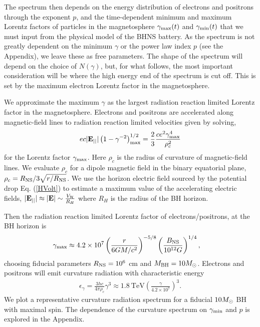 The spectrum then depends on the energy distribution of electrons and
positrons through the exponent $p$, and the time-dependent minimum and
maximum Lorentz factors of particles in the magnetosphere $\gamma_{\rm
  max}(t)$ and $\gamma_{\rm min}(t)$ that we must input from the
physical model of the BHNS battery. As the spectrum is not greatly
dependent on the minimum $\gamma$ or the power law index $p$ (see the
Appendix), we leave these as free parameters. The shape of the
spectrum will depend on the choice of $N(\gamma)$, but, for what
follows, the most important consideration will be where the high
energy end of the spectrum is cut off. This is set by the maximum
electron Lorentz factor in the magnetosphere.

We approximate the maximum $\gamma$ as the largest radiation reaction
limited Lorentz factor in the magnetosphere. Electrons and positrons
are accelerated along magnetic-field lines to radiation reaction
limited velocities given by solving,
\begin{align}
 e c |{\bf E}_{||}| \left( 1 - \gamma^{-2}\right)^{1/2}_{\rm max}=
 \frac{2}{3} \frac{c e^2 \gamma^4_{\rm max}}{ \rho_c^2}
 \label{Eq:GamMax}
\end{align}
for the Lorentz factor $\gamma_{\rm max}$. Here $\rho_c$ is the radius
of curvature of magnetic-field lines. We evaluate $\rho_c$ for a
dipole magnetic field in the binary equatorial plane, $\rho_c = R_{\rm NS}/3
\sqrt{r/R_{\rm NS}}$.  We use the horizon electric field sourced by the
potential drop Eq. (\ref{HVolt}) to estimate a maximum value of the
accelerating electric fields, $ |{\bf E}_{||}| \approx |{\bf E}| \sim
\frac{V_{\mathcal{H}}}{ R_{H}} $ where $R_H$ is
the radius of the BH horizon.





Then the radiation reaction limited Lorentz factor of
electrons/positrons, at the BH horizon is
\begin{align}
\gamma_{\rm max} &\approx 4.2 \times 10^7 \left(\frac{r}{6GM/c^2}
\right)^{-5/8} \left(\frac{B_{\rm NS}}{10^{12} G} \right)^{1/4},
\label{Eq:GamMax}
\end{align}
choosing fiducial parameters $R_{\rm NS} = 10^6$ cm and $M_{\rm BH}= 10
{{M_{\odot}}}$.  Electrons and positrons will emit curvature radiation with
characteristic energy
\begin{align}
\epsilon_{\gamma} = \frac{3hc}{4 \pi \rho_c} \gamma^3 \approx 1.8
\ \mbox{TeV} \left(\frac{\gamma}{4.2 \times 10^7}\right)^3.
\end{align}
We plot a representative curvature radiation spectrum for a fiducial
$10 {M_{\odot}}$ BH with maximal spin. The dependence of the curvature
spectrum on $\gamma_{\rm min}$ and $p$ is explored in the Appendix.



